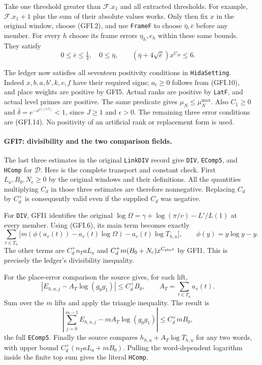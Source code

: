 Take one threshold greater than $\mathcal F.x_1$ and all extracted
thresholds.  For example, $\mathcal F.x_1+1$ plus the sum of
their absolute values works.  Only then fix $x$ in the original
window, choose (GFI.2), and use \texttt{FrameF} to choose
$\bar\eta,\bar e$ before any member.  For every $h$ choose its
frame errors $\eta_h,e_h$ within these same bounds.  They satisfy
\[
 0\le\bar e\le\tfrac14,\quad 0\le\bar\eta,\qquad
 (\bar\eta+4\sqrt{\bar e})x^{C_H}\le6.                 \tag{GFI.14}
\]

The ledger now satisfies all seventeen positivity conditions in
\texttt{HidaSetting}.  Indeed $x,b,a,b',k,v,f$ have their
required signs; $a_t\ge0$ follows from (GFI.10), and place weights
are positive by GFI5.  Actual ranks are positive by \texttt{LatF},
and actual level primes are positive.  The same predicate gives
$\mu_N\le\mu_N^{\max}$.  Also $C_1\ge0$ and
$\bar\delta=e^{-x^{\epsilon/(7J)}}<1$, since $J\ge1$ and
$\epsilon>0$.  The remaining three error conditions are (GFI.14).
No positivity of an artificial rank or replacement form is used.

\paragraph{GFI7: divisibility and the two comparison fields.}
\label{claim:GFI7}
The last three estimates in the original \texttt{LinkDIV} record
give \texttt{DIV}, \texttt{EComp5}, and \texttt{HComp} for
$\mathscr D$.  Here is the complete transport and constant check.
First $L_a,B_0,N_c\ge0$ by the original windows and their
definitions.  All the quantities multiplying $C_d$ in those three
estimates are therefore nonnegative.  Replacing $C_d$ by $C_d^+$
is consequently valid even if the supplied $C_d$ was negative.

For \texttt{DIV}, GFI1 identifies the original
$\log\Omega=\gamma+\log(\pi/v)-L'/L(1)$ at every member.
Using (GFI.6), its main term becomes exactly
\[
 \sum_{t\in T_n}\bigl[m(\phi(a_v(t))-a_v(t)\log\Omega)
                       -a_v(t)\log T_{h,u}\bigr],
 \qquad \phi(y)=y\log y-y.                            \tag{GFI.15}
\]
The other terms are $C_d^+n_TaL_a$ and
$C_d^+m(B_0+N_c)x^{C_{\rm abs}\epsilon}$ by GFI1.
This is precisely the ledger's divisibility inequality.

For the place-error comparison the source gives, for each lift,
\[
 |E_{h,u,j}-A_T\log(g_0g_1)|\le C_d^+B_0,
 \qquad A_T=\sum_{t\in T_n}a_v(t).
\]
Sum over the $m$ lifts and apply the triangle inequality.  The
result is
\[
 \left|\sum_{j=0}^{m-1}E_{h,u,j}
                -mA_T\log(g_0g_1)\right|\le C_d^+mB_0,
                                                               \tag{GFI.16}
\]
the full \texttt{EComp5}.  Finally the source compares
$h_{h,u}+A_T\log T_{h,u}$ for any two words, with upper bound
$C_d^+(n_TaL_a+mB_0)$.  Pulling the word-dependent logarithm
inside the finite top sum gives the literal \texttt{HComp}.

